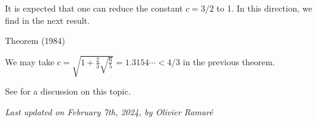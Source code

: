 It is expected that one can reduce the constant $c=3/2$ to 1. In this
direction, we find in
\cite{Preissmann*84}
the next result.
\par 
\begin{thm}{Theorem (1984)}

We may take $\displaystyle c= \sqrt{1+\tfrac23\sqrt{\tfrac65}} =
1.3154\cdots < 4/3$ in the previous theorem.
\end{thm}


See
\cite{Yangjit*23}
for a discussion on this topic.


 
 








  
\begin{flushright}\small\sl{}   Last updated on February 7th, 2024, by Olivier Ramar\'e
 \end{flushright}















